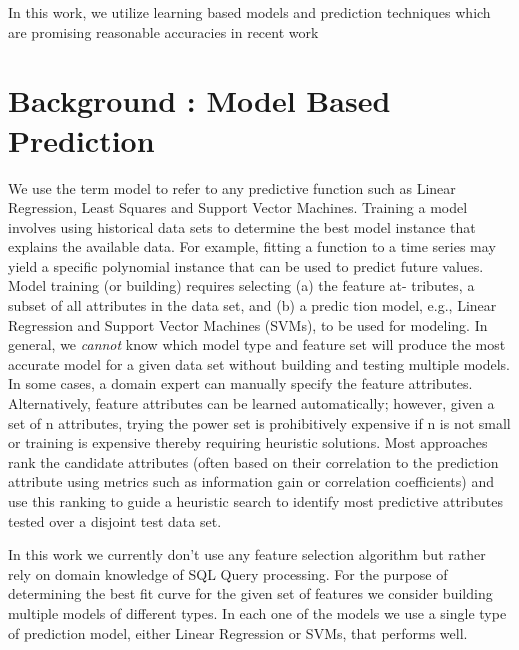 \documentclass{article}
\begin{document}
\begin{multicols}{2}
	In this work, we utilize learning based models and prediction techniques which are promising reasonable accuracies in recent work \cite{ganapathi,MSR,ICDE2012}
	
	\section{Background : Model Based Prediction}	
	We use the term model to refer to any predictive function such as
	Linear Regression, Least Squares and Support Vector Machines.
	Training a model involves using historical data sets to determine the
	best model instance that explains the available data. For example,
	fitting a function to a time series may yield a specific polynomial
	instance that can be used to predict future values.
	Model training (or building) requires selecting (a) the feature at-
	tributes, a subset of all attributes in the data set, and (b) a predic
	tion model, e.g., Linear Regression and Support Vector Machines
	(SVMs), to be used for modeling. In general, we \textit{cannot} know
	which model type and feature set will produce the most accurate
	model for a given data set without building and testing multiple
	models. In some cases, a domain expert can manually specify the
	feature attributes. Alternatively, feature attributes can be learned
	automatically; however, given a set of n attributes, trying the power
	set is prohibitively expensive if n is not small or training is expensive 
	thereby requiring heuristic solutions.
	Most approaches rank the candidate attributes (often based on their
	correlation to the prediction attribute using metrics such as information 
	gain or correlation coefficients) and use this ranking to guide
	a heuristic search \cite{datamining} to identify most predictive attributes tested
	over a disjoint test data set. 

	In this work we currently don't use any feature selection algorithm but rather rely on domain 
knowledge of SQL Query processing. For the purpose of determining the best fit curve for the given set of features we consider building multiple models of different types. In each one of the models we use a single type of prediction model, either Linear Regression or SVMs, that performs well.


\end{multicols}
\end{document}
